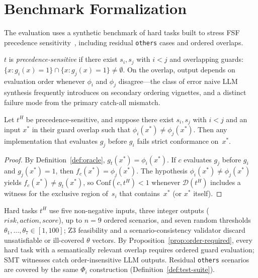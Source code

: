 \section{Benchmark Formalization}
\label{sec:form:benchmark}

The evaluation uses a synthetic benchmark of hard tasks built to stress FSF
precedence sensitivity~\citep{li2023iet_faultprevention}, including residual
\texttt{others} cases and ordered overlaps.

\begin{definition}
\label{def:prec-sensitive}
$t$ is \emph{precedence-sensitive} if there exist $s_i,s_j$ with $i<j$ and
overlapping guards:
$\{x:g_i(x)=1\}\cap\{x:g_j(x)=1\}\neq\emptyset$.
On the overlap, output depends on evaluation order whenever
$\phi_i$ and $\phi_j$ disagree---the class of error naive LLM synthesis
frequently introduces on secondary ordering vignettes, and a distinct failure
mode from the primary catch-all mismatch.
\end{definition}

\begin{proposition}
\label{prop:order-required}
Let $t^H$ be precedence-sensitive, and suppose there exist $s_i,s_j$ with
$i<j$ and an input $x^*$ in their guard overlap such that
$\phi_i(x^*)\neq\phi_j(x^*)$.
Then any implementation that evaluates $g_j$ before $g_i$ fails strict
conformance on~$x^*$.
\end{proposition}

\begin{proof}
By Definition~\ref{def:oracle}, $g_t(x^*)=\phi_i(x^*)$.
If $c$ evaluates $g_j$ before $g_i$ and $g_j(x^*)=1$, then
$f_c(x^*)=\phi_j(x^*)$.
The hypothesis $\phi_i(x^*)\neq\phi_j(x^*)$ yields
$f_c(x^*)\neq g_t(x^*)$, so $\mathrm{Conf}(c,t^H)<1$ whenever
$\mathcal{D}(t^H)$ includes a witness for the exclusive region of~$s_i$
that contains~$x^*$ (or $x^*$ itself).
\end{proof}

Hard tasks $t^H$ use five non-negative inputs, three integer outputs
($\mathit{risk},\mathit{action},\mathit{score}$), up to $n=9$ ordered
scenarios, and seven random thresholds $\theta_1,\ldots,\theta_7\in[1,100]$;
Z3 feasibility and a scenario-consistency validator discard unsatisfiable or
ill-covered $\theta$ vectors.
By Proposition~\ref{prop:order-required}, every hard task with a
semantically relevant overlap requires ordered guard evaluation; SMT
witnesses catch order-insensitive LLM outputs.
Residual \texttt{others} scenarios are covered by the same $\Phi_i$
construction (Definition~\ref{def:test-suite}).

